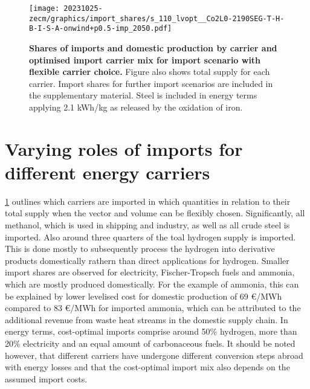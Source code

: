\begin{figure}
    \texttt{[image: 20231025-zecm/graphics/import\_shares/s\_110\_lvopt\_\_Co2L0-2190SEG-T-H-B-I-S-A-onwind+p0.5-imp\_2050.pdf]}
    \caption{\textbf{Shares of imports and domestic production by carrier and optimised import carrier mix for import scenario with flexible carrier choice.} 
        Figure also shows total supply for each carrier.
        Import shares for further import scenarios are included in the supplementary material.
        Steel is included in energy terms applying 2.1 kWh/kg as released by the oxidation of iron.
    }
    \label{fig:import-shares}
\end{figure}

\section*{Varying roles of imports for different energy carriers}

\cref{fig:import-shares} outlines which carriers are imported in which
quantities in relation to their total supply when the vector and volume can be
flexibly chosen. Significantly, all methanol, which is used in shipping and
industry, as well as all crude steel is imported. Also around three quarters of
the toal hydrogen supply is imported. This is done mostly to subsequently
process the hydrogen into derivative products domestically rathern than direct
applications for hydrogen. Smaller import shares are observed for electricity,
Fischer-Tropsch fuels and ammonia, which are mostly produced domestically. For
the example of ammonia, this can be explained by lower levelised cost for
domestic production of 69 \euro{}/MWh compared to 83 \euro{}/MWh for imported
ammonia, which can be attributed to the additional revenue from waste heat
streams in the domestic supply chain. In energy terms, cost-optimal imports
comprise around 50\% hydrogen, more than 20\% electricity and an equal amount of
carbonaceous fuels. It should be noted however, that different carriers have
undergone different conversion steps abroad with energy losses and that the
cost-optimal import mix also depends on the assumed import costs.



